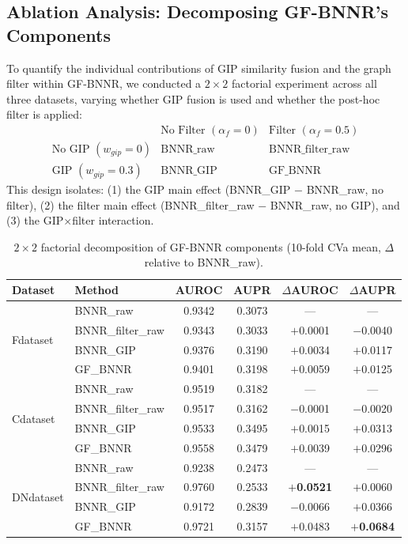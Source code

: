 \documentclass[unnumsec,webpdf,contemporary,large]{oup-authoring-template}
\begin{document}
\subsection{Ablation Analysis: Decomposing GF-BNNR's Components}
\label{sec:ablation}

To quantify the individual contributions of GIP similarity fusion and the graph filter within GF-BNNR, we conducted a $2\times2$ factorial experiment across all three datasets, varying whether GIP fusion is used and whether the post-hoc filter is applied:
%
\begin{equation*}
\begin{array}{c|cc}
& \text{No Filter }(\alpha_f=0) & \text{Filter }(\alpha_f=0.5) \\ \hline
\text{No GIP }(w_{gip}=0) & \text{BNNR\_raw} & \text{BNNR\_filter\_raw} \\
\text{GIP }(w_{gip}=0.3) & \text{BNNR\_GIP} & \text{GF\_BNNR}
\end{array}
\end{equation*}
%
This design isolates: (1) the GIP main effect (BNNR\_GIP $-$ BNNR\_raw, no filter), (2) the filter main effect (BNNR\_filter\_raw $-$ BNNR\_raw, no GIP), and (3) the GIP$\times$filter interaction.

\begin{table}[t]
\centering
\caption{$2\times2$ factorial decomposition of GF-BNNR components (10-fold CVa mean, $\Delta$ relative to BNNR\_raw).}
\label{tab:ablation}
\begin{tabular}{l l c c c c}
\toprule
Dataset & Method & AUROC & AUPR & $\Delta$AUROC & $\Delta$AUPR \\
\midrule
\multirow{4}{*}{Fdataset}
  & BNNR\_raw   & 0.9342 & 0.3073 & --- & --- \\
  & BNNR\_filter\_raw & 0.9343 & 0.3033 & $+$0.0001 & $-$0.0040 \\
  & BNNR\_GIP   & 0.9376 & 0.3190 & $+$0.0034 & $+$0.0117 \\
  & GF\_BNNR    & 0.9401 & 0.3198 & $+$0.0059 & $+$0.0125 \\
\midrule
\multirow{4}{*}{Cdataset}
  & BNNR\_raw   & 0.9519 & 0.3182 & --- & --- \\
  & BNNR\_filter\_raw & 0.9517 & 0.3162 & $-$0.0001 & $-$0.0020 \\
  & BNNR\_GIP   & 0.9533 & 0.3495 & $+$0.0015 & $+$0.0313 \\
  & GF\_BNNR    & 0.9558 & 0.3479 & $+$0.0039 & $+$0.0296 \\
\midrule
\multirow{4}{*}{DNdataset}
  & BNNR\_raw   & 0.9238 & 0.2473 & --- & --- \\
  & BNNR\_filter\_raw & 0.9760 & 0.2533 & \textbf{$+$0.0521} & $+$0.0060 \\
  & BNNR\_GIP   & 0.9172 & 0.2839 & $-$0.0066 & $+$0.0366 \\
  & GF\_BNNR    & 0.9721 & 0.3157 & $+$0.0483 & \textbf{$+$0.0684} \\
\bottomrule
\end{tabular}
\end{table}
\end{document}
